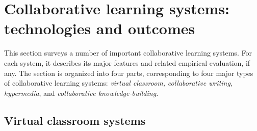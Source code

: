 

\section{Collaborative learning systems: technologies and outcomes}
\label{sec:cscl-systems}

This section surveys a number of important collaborative learning systems.
For each system, it describes its major features and related empirical
evaluation, if any. The section is organized into four parts, corresponding
to four major types of collaborative learning systems: {\it virtual
classroom,\/} {\it collaborative writing,\/} {\it hypermedia\/}, and {\it
collaborative knowledge-building.\/}


\subsection{Virtual classroom systems}

